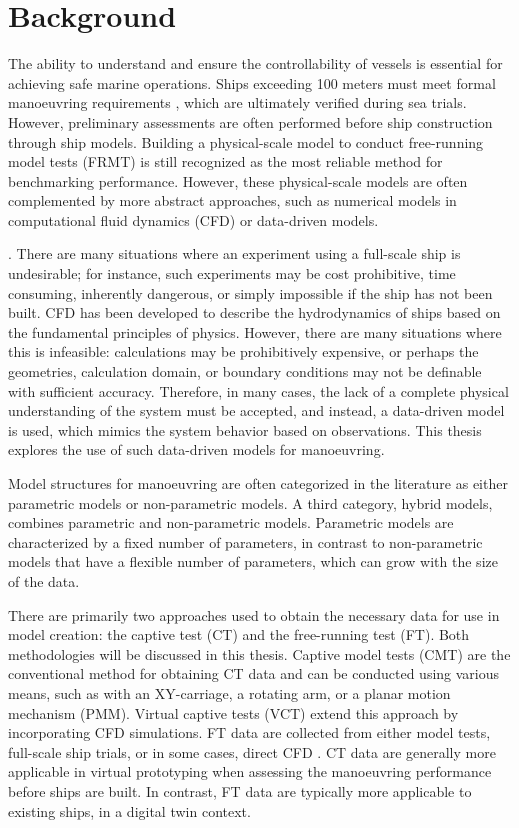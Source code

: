 \section{Background}
The ability to understand and ensure the controllability of vessels is essential for achieving safe marine operations. Ships exceeding 100 meters must meet formal manoeuvring requirements \cite{imoStandardsShipManoeuvrability2002}, which are ultimately verified during sea trials. However, preliminary assessments are often performed before ship construction through ship models. Building a physical-scale model to conduct free-running model tests (FRMT) is still recognized as the most reliable method \cite{ittcManeuveringCommitteeITTC2008} for benchmarking performance. However, these physical-scale models are often complemented by more abstract approaches, such as numerical models in computational fluid dynamics (CFD) or data-driven models.

 \cite{ljungModelingIdentificationDynamic2021}. There are many situations where an experiment using a full-scale ship is undesirable; for instance, such experiments may be cost prohibitive, time consuming, inherently dangerous, or simply impossible if the ship has not been built. CFD has been developed to describe the hydrodynamics of ships based on the fundamental principles of physics. However, there are many situations where this is infeasible: calculations may be prohibitively expensive, or perhaps the geometries, calculation domain, or boundary conditions may not be definable with sufficient accuracy. Therefore, in many cases, the lack of a complete physical understanding of the system must be accepted, and instead, a data-driven model is used, which mimics the system behavior based on observations. This thesis explores the use of such data-driven models for manoeuvring.

Model structures for manoeuvring are often categorized in the literature as either parametric models or non-parametric models. A third category, hybrid models, combines parametric and non-parametric models. 
Parametric models are characterized by a fixed number of parameters, in contrast to non-parametric models that have a flexible number of parameters, which can grow with the size of the data. 

There are primarily two approaches used to obtain the necessary data for use in model creation: the captive test (CT) and the free-running test (FT). Both methodologies will be discussed in this thesis.  Captive model tests (CMT) are the conventional method for obtaining CT data and can be conducted using various means, such as with an XY-carriage, a rotating arm, or a planar motion mechanism (PMM). Virtual captive tests (VCT) extend this approach by incorporating CFD simulations. FT data are collected from either model tests, full-scale ship trials, or in some cases, direct CFD \cite{arakiEstimatingManeuveringCoefficients2012}. CT data are generally more applicable in virtual prototyping when assessing the manoeuvring performance before ships are built. In contrast, FT data are typically more applicable to existing ships, in a digital twin context.

